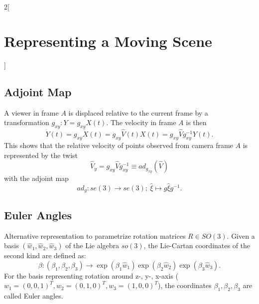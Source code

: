 \documentclass[oneside,fontsize=11pt,paper=a4]{scrartcl}
\begin{document}
\begin{multicols}{2}[\section{Representing a Moving Scene}]
\subsection{Adjoint Map}
A viewer in frame $A$ is displaced relative to the current frame by a transformation $g_{xy}: Y = g_{xy} X(t)$.
The velocity in frame $A$ is then
\begin{equation*}
    \dot{Y}(t) = g_{xy} \dot{X}(t) = g_{xy} \hat{V}(t) X(t) = g_{xy} \hat{V} g_{xy}^{-1} Y(t).
\end{equation*}
This shows that the relative velocity of points observed from camera frame $A$ is represented by the twist
\begin{equation*}
    \hat{V}_y = g_{xy} \hat{V} g_{xy}^{-1} \equiv ad_{g_{xy}}(\hat{V})
\end{equation*}
with the adjoint map
\begin{equation*}
	ad_g: se(3) \rightarrow se(3); \ \hat{\xi} \mapsto g \hat{\xi} g^{-1}.
\end{equation*}

\subsection{Euler Angles}
Alternative representation to parametrize rotation matrices $R \in SO(3)$.
Given a basis $(\hat{w}_1, \hat{w}_2, \hat{w}_3)$ of the Lie algebra $so(3)$, the Lie-Cartan coordinates of the second kind are defined as:
\begin{equation*}
    \beta :  (\beta_1, \beta_2, \beta_3)  \rightarrow  \exp{(\beta_1 \hat{w}_1)} \exp{(\beta_2 \hat{w}_2)} \exp{(\beta_3 \hat{w}_3)}.
\end{equation*}
For the basis representing rotation around z-, y-, x-axis ($w_1 = (0,0,1)^T, w_2 = (0,1,0)^T, w_3 = (1,0,0)^T$), the coordinates $\beta_1, \beta_2, \beta_3$ are called Euler angles.
\end{multicols}
\end{document}
